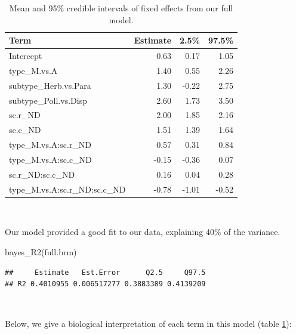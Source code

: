 \documentclass[11pt,]{article}
\newenvironment{Shaded}{}{}
\newcommand{\KeywordTok}[1]{\textcolor[rgb]{0.00,0.00,1.00}{#1}}
\newcommand{\NormalTok}[1]{#1}
\begin{document}
\begin{table}[!h]

\caption{\label{tab:full-table}Mean and 95\% credible intervals of fixed effects from our full model.}
\centering
\begin{tabular}{lrrr}
\toprule
Term & Estimate & 2.5\% & 97.5\%\\
\midrule
\rowcolor{gray!6}  Intercept & 0.63 & 0.17 & 1.05\\
type\_M.vs.A & 1.40 & 0.55 & 2.26\\
\rowcolor{gray!6}  subtype\_Herb.vs.Para & 1.30 & -0.22 & 2.75\\
subtype\_Poll.vs.Disp & 2.60 & 1.73 & 3.50\\
\rowcolor{gray!6}  sc.r\_ND & 2.00 & 1.85 & 2.16\\
sc.c\_ND & 1.51 & 1.39 & 1.64\\
\rowcolor{gray!6}  type\_M.vs.A:sc.r\_ND & 0.57 & 0.31 & 0.84\\
type\_M.vs.A:sc.c\_ND & -0.15 & -0.36 & 0.07\\
\rowcolor{gray!6}  sc.r\_ND:sc.c\_ND & 0.16 & 0.04 & 0.28\\
type\_M.vs.A:sc.r\_ND:sc.c\_ND & -0.78 & -1.01 & -0.52\\
\bottomrule
\end{tabular}
\end{table}

~

Our model provided a good fit to our data, explaining 40\% of the
variance.

\begin{Shaded}
\begin{Highlighting}[]
\KeywordTok{bayes_R2}\NormalTok{(full.brm)}
\end{Highlighting}
\end{Shaded}

\begin{verbatim}
##     Estimate   Est.Error      Q2.5     Q97.5
## R2 0.4010955 0.006517277 0.3883389 0.4139209
\end{verbatim}

~

Below, we give a biological interpretation of each term in this model
(table \ref{tab:full-table}):
\end{document}
